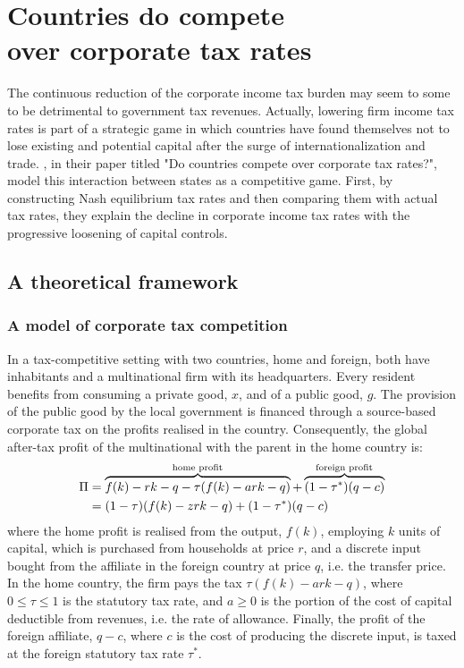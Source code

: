 \chapter[Do countries compete over corporate tax rates?]{Countries do compete \\over corporate tax rates}
\vspace{-11pt}
The continuous reduction of the corporate income tax burden may seem to some to be detrimental to government tax revenues. Actually, lowering firm income tax rates is part of a strategic game in which countries have found themselves not to lose existing and potential capital after the surge of internationalization and trade. \textcite{dev-loc-red-08}, in their paper titled "Do countries compete over corporate tax rates?", model this interaction between states as a competitive game. First, by constructing Nash equilibrium tax rates and then comparing them with actual tax rates, they explain the decline in corporate income tax rates with the progressive loosening of capital controls.
\vspace{-7pt}
\section{A theoretical framework}
\vspace{-10pt}
\subsection{A model of corporate tax competition}
In a tax-competitive setting with two countries, home and foreign, both have inhabitants and a multinational firm with its headquarters. Every resident benefits from consuming a private good, \(x\), and of a public good, $g$. The provision of the public good by the local government is financed through a source-based corporate tax on the profits realised in the country. Consequently, the global after-tax profit of the multinational with the parent in the home country is:
\begin{align}
\Pi&=\overbrace{f(k)-rk-q-\tau(f(k)-ark-q)}^{\textsubscript{home profit}}+\overbrace{(1-\tau^*)(q-c)}^{\textsubscript{foreign profit}}\\
&=(1-\tau)(f(k)-zrk-q)+(1-\tau^*)(q-c)\notag
\end{align}
where the home profit is realised from the output, $f(k)$, employing $k$ units of capital, which is purchased from households at price $r$, and a discrete input bought from the affiliate in the foreign country at price $q$, i.e. the transfer price. In the home country, the firm pays the tax  $\tau(f(k)-ark-q)$, where $0\le\tau\le1$ is the statutory tax rate, and $a\ge0$ is the portion of the cost of capital deductible from revenues, i.e. the rate of allowance. Finally, the profit of the foreign affiliate, $q-c$, where $c$ is the cost of producing the discrete input, is taxed at the foreign statutory tax rate $\tau^*$.

